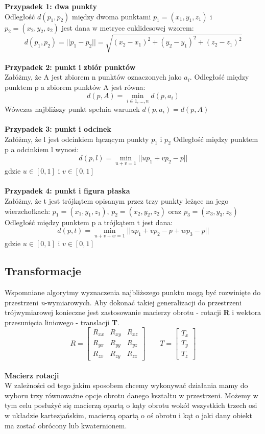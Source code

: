 \documentclass[12pt]{article}
\begin{document}
\textbf{Przypadek 1: dwa punkty}
\\
Odległość $d(p_{1}, p_{2})$ między dwoma punktami $p_{1} = (x_{1}, y_{1}, z_{1})$
i $p_{2} = (x_{2}, y_{2}, z_{2})$ jest dana w metryce euklidesowej wzorem: 
\[d(p_{1}, p_{2}) = ||p_{1} - p_{2}|| = \sqrt{(x_{2}-x_{1})^2+(y_{2}-y_{1})^2+(z_{2}-z_{1})^2}\]
\\
\textbf{Przypadek 2: punkt i zbiór punktów}
\\
Załóżmy, że A jest zbiorem n punktów oznaczonych jako $a_{i}$. Odległość między punktem p a zbiorem punktów A jest równa:
\[d(p, A) = \min_{i \in {1,...,n}} d(p, a_{i})\]
Wówczas najbliższy punkt spełnia warunek $d(p, a_{i}) = d(p, A)$
\\
\\
\textbf{Przypadek 3: punkt i odcinek}
\\
Załóżmy, że l jest odcinkiem łączącym punkty $p_{1}$ i $p_{2}$ Odległość między punktem p a odcinkiem l wynosi:
\[d(p, l) = \min_{u+v=1} ||up_{1}+vp_{2}-p|| \]
gdzie $u \in [0, 1]$ i $v \in [0, 1]$ 
\\
\\
\textbf{Przypadek 4: punkt i figura płaska}
\\
Załóżmy, że t jest trójkątem opisanym przez trzy punkty leżące na jego wierzchołkach: $p_{1} = (x_{1}, y_{1}, z_{1})$, $p_{2} = (x_{2}, y_{2}, z_{2})$ oraz $p_{3} = (x_{3}, y_{3}, z_{3})$ Odległość między punktem p a trójkątem t jest dana:
\[d(p, t) = \min_{u+v+w=1} ||up_{1}+vp_{2}-p+wp_{3}-p|| \]
gdzie $u \in [0, 1]$ i $v \in [0, 1]$ 
\\
\subsection{Transformacje}
Wspomniane algorytmy wyznaczenia najbliższego punktu mogą być rozwinięte do przestrzeni \emph{n}-wymiarowych. Aby dokonać takiej generalizacji do przestrzeni trójwymiarowej konieczne jest zastosowanie macierzy obrotu - rotacji \textbf{R} i wektora przesunięcia liniowego - translacji \textbf{T}.
\[
R = \begin{bmatrix}
R_{xx} & R_{xy} & R_{xz} \\
R_{yx} & R_{yy} & R_{yz} \\
R_{zx} & R_{zy} & R_{zz}
\end{bmatrix}
\qquad
T = \begin{bmatrix}
T_{x} \\ T_{y} \\ T_{z}
\end{bmatrix}
\]
\\
\textbf{Macierz rotacji}
\\
W zależności od tego jakim sposobem chcemy wykonywać działania mamy do wyboru trzy równoważne opcje obrotu danego kształtu w przestrzeni. Możemy w tym celu posłużyć się macierzą opartą o kąty obrotu wokół wszystkich trzech osi w układzie kartezjańskim, macierzą opartą o oś obrotu i kąt o jaki dany obiekt ma zostać obrócony lub kwaternionem.
\end{document}
